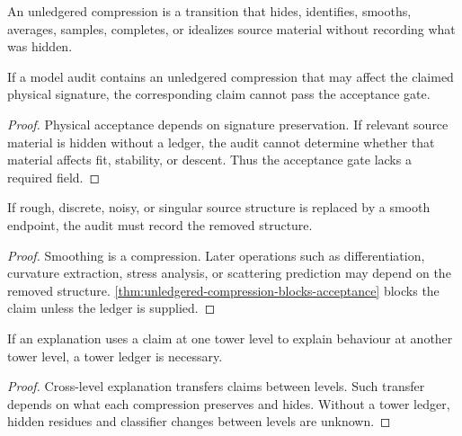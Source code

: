 \begin{definition}
\label{def:unledgered-compression-audit}
An unledgered compression is a transition that hides, identifies, smooths, averages, samples, completes, or idealizes source material without recording what was hidden.
\end{definition}

\begin{theorem}
\label{thm:unledgered-compression-blocks-acceptance}
If a model audit contains an unledgered compression that may affect the claimed physical signature, the corresponding claim cannot pass the acceptance gate.
\end{theorem}

\begin{proof}
Physical acceptance depends on signature preservation. If relevant source material is hidden without a ledger, the audit cannot determine whether that material affects fit, stability, or descent. Thus the acceptance gate lacks a required field.
\end{proof}

\begin{corollary}
\label{cor:smooth-endpoints-source-ledgers}
If rough, discrete, noisy, or singular source structure is replaced by a smooth endpoint, the audit must record the removed structure.
\end{corollary}

\begin{proof}
Smoothing is a compression. Later operations such as differentiation, curvature extraction, stress analysis, or scattering prediction may depend on the removed structure. \autoref{thm:unledgered-compression-blocks-acceptance} blocks the claim unless the ledger is supplied.
\end{proof}

\begin{theorem}
\label{thm:tower-ledger-necessary-cross-level-explanation}
If an explanation uses a claim at one tower level to explain behaviour at another tower level, a tower ledger is necessary.
\end{theorem}

\begin{proof}
Cross-level explanation transfers claims between levels. Such transfer depends on what each compression preserves and hides. Without a tower ledger, hidden residues and classifier changes between levels are unknown.
\end{proof}


